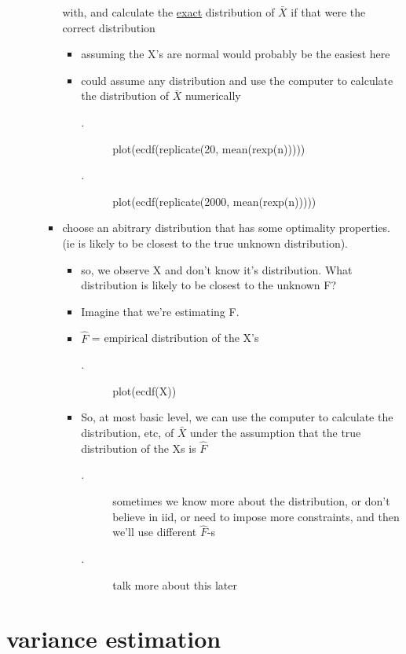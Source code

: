 \begin{itemize}
\begin{itemize}
\begin{itemize}
         with, and calculate the \underline{exact} distribution of $\bar X$ if
         that were the correct distribution
\begin{itemize}
\item assuming the X's are normal would probably be the easiest here
\item could assume any distribution and use the computer to
           calculate the distribution of $\bar X$ numerically
\begin{description}
\item[.] plot(ecdf(replicate(20, mean(rexp(n)))))
\item[.] plot(ecdf(replicate(2000, mean(rexp(n)))))
\end{description}
\end{itemize}
\item choose an abitrary distribution that has some optimality
         properties. (ie is likely to be closest to the true unknown
         distribution).
\begin{itemize}
\item so, we observe X and don't know it's distribution.  What
           distribution is likely to be closest to the unknown F?
\item Imagine that we're estimating F.
\item $\hat F$ = empirical distribution of the X's
\begin{description}
\item[.] plot(ecdf(X))
\end{description}
\item So, at most basic level, we can use the computer to
           calculate the distribution, etc, of $\bar X$ under the
           assumption that the true distribution of the Xs is $\hat F$
\begin{description}
\item[.] sometimes we know more about the distribution, or don't
             believe in iid, or need to impose more constraints, and
             then we'll use different $\hat F$-s
\item[.] talk more about this later
\end{description}
\end{itemize}
\end{itemize}
\end{itemize}
\end{itemize}

\section{variance estimation}

